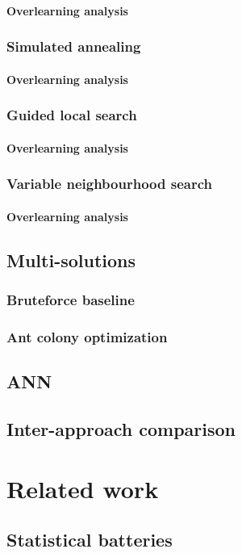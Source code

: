 \documentclass[
  print, %
  Table,   %
  nolof,     %
  nolot,     %
  11pt, %
  oneside  %
]{fithesis3}
\begin{document}
\subsubsection{Overlearning analysis}
\subsection{Simulated annealing}
\subsubsection{Overlearning analysis}
\subsection{Guided local search}
\subsubsection{Overlearning analysis}
\subsection{Variable neighbourhood search}
\subsubsection{Overlearning analysis}
\section{Multi-solutions}
\subsection{Bruteforce baseline}
\subsection{Ant colony optimization}
\section{ANN}
\section{Inter-approach comparison}

\chapter{Related work}

\section{Statistical batteries}
\end{document}
